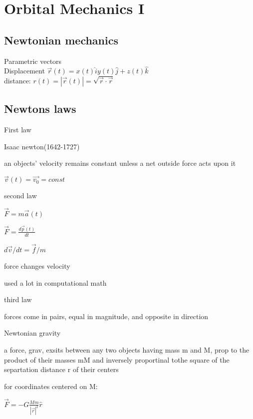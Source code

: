 \documentclass{article}
\begin{document}
\section{Orbital Mechanics I}
\subsection{Newtonian mechanics}
Parametric vectors\\
Displacement $\vec{r}(t) = x(t)\hat{i}y(t)\hat{j}+z(t)\hat{k}$ \\
distance: $r(t) = |\vec{r}(t)| = \sqrt{\vec{r} \cdot \vec{r}}$ \\

\subsection{Newtons laws}

First law
\begin{list}{-}{}
\item Isaac newton(1642-1727)
\item an objects' velocity remains constant unless a net outside force acts upon it
\item $\vec{v}(t) =\vec{v_0} =const$
\end{list}

second law
\begin{list}{-}{}
\item $\vec{F} = m\vec{a}(t)$
\item $\vec{F} = \frac{d\vec{p}(t)}{dt}$
\item $d\vec{v}/dt =\vec{f}/m$
\item force changes velocity
\item used a lot in computational math
\end{list}

third law
\begin{list}{-}{}
\item forces come in pairs, equal in magnitude, and opposite in direction
\end{list}

Newtonian gravity
\begin{list}{-}{}
\item a force, grav, exsits between any two objects having mass m and M, prop to the product of their masses mM and inversely proportinal tothe square of the separtation distance r of their centers
\item for coordinates centered on M:
\item $\vec{F} = -G\frac{Mm}{|\vec{r}|^2}\hat{r}$
\end{list}
\end{document}
